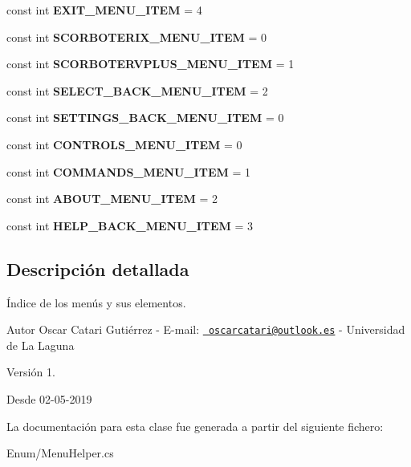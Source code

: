 \begin{DoxyCompactItemize}
const int {\bfseries E\+X\+I\+T\+\_\+\+M\+E\+N\+U\+\_\+\+I\+T\+EM} = 4
\item 
\mbox{\label{class_menu_helper_a9cdf00a5033edc3faadc401b94ad57ff}} 
const int {\bfseries S\+C\+O\+R\+B\+O\+T\+E\+R\+I\+X\+\_\+\+M\+E\+N\+U\+\_\+\+I\+T\+EM} = 0
\item 
\mbox{\label{class_menu_helper_add5a38fb0a7ae99b912b979dad0a3d17}} 
const int {\bfseries S\+C\+O\+R\+B\+O\+T\+E\+R\+V\+P\+L\+U\+S\+\_\+\+M\+E\+N\+U\+\_\+\+I\+T\+EM} = 1
\item 
\mbox{\label{class_menu_helper_aadf82db07fdf0fe9a664a16a45ded128}} 
const int {\bfseries S\+E\+L\+E\+C\+T\+\_\+\+B\+A\+C\+K\+\_\+\+M\+E\+N\+U\+\_\+\+I\+T\+EM} = 2
\item 
\mbox{\label{class_menu_helper_ac079a1f17aee9f56c3c634a1aa5959d0}} 
const int {\bfseries S\+E\+T\+T\+I\+N\+G\+S\+\_\+\+B\+A\+C\+K\+\_\+\+M\+E\+N\+U\+\_\+\+I\+T\+EM} = 0
\item 
\mbox{\label{class_menu_helper_a17d0144189f15504d1bc06ff75ce9ace}} 
const int {\bfseries C\+O\+N\+T\+R\+O\+L\+S\+\_\+\+M\+E\+N\+U\+\_\+\+I\+T\+EM} = 0
\item 
\mbox{\label{class_menu_helper_a86ea0eaa15b1676068d97d306a35702d}} 
const int {\bfseries C\+O\+M\+M\+A\+N\+D\+S\+\_\+\+M\+E\+N\+U\+\_\+\+I\+T\+EM} = 1
\item 
\mbox{\label{class_menu_helper_a5b397dee129b11d62e407bfd40ca0734}} 
const int {\bfseries A\+B\+O\+U\+T\+\_\+\+M\+E\+N\+U\+\_\+\+I\+T\+EM} = 2
\item 
\mbox{\label{class_menu_helper_ad8b54c181ecbc25184317a12e7ee8969}} 
const int {\bfseries H\+E\+L\+P\+\_\+\+B\+A\+C\+K\+\_\+\+M\+E\+N\+U\+\_\+\+I\+T\+EM} = 3
\end{DoxyCompactItemize}


\subsection{Descripción detallada}
Índice de los menús y sus elementos. \begin{DoxyAuthor}{Autor}
Oscar Catari Gutiérrez -\/ E-\/mail\+: \href{mailto:oscarcatari@outlook.es}{\texttt{ oscarcatari@outlook.\+es}} -\/ Universidad de La Laguna 
\end{DoxyAuthor}
\begin{DoxyVersion}{Versión}
1. 
\end{DoxyVersion}
\begin{DoxySince}{Desde}
02-\/05-\/2019 
\end{DoxySince}


La documentación para esta clase fue generada a partir del siguiente fichero\+:\begin{DoxyCompactItemize}
\item 
Enum/Menu\+Helper.\+cs\end{DoxyCompactItemize}
